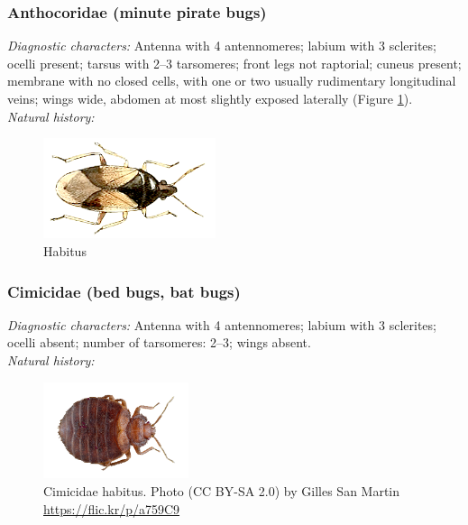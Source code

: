 \documentclass[letterpaper, 11pt]{article}
\begin{document}
\subsubsection{Anthocoridae (minute pirate bugs)}
\noindent{}\textit{Diagnostic characters:} Antenna with 4 antennomeres; labium with 3 sclerites; ocelli present; tarsus with 2--3 tarsomeres; front legs not raptorial; cuneus present; membrane with no closed cells, with one or two usually rudimentary longitudinal veins; wings wide, abdomen at most slightly exposed laterally (Figure \ref{fig:anthocorid1}).\\

\noindent{}\textit{Natural history:} \\

\begin{figure}[ht!]
 \centering
 \includegraphics[width=0.45\textwidth]{AnthocoridHabitus}
 \caption{Habitus \citep[][Plate 18, Fig. 10]{bhl45818}}
 \label{fig:anthocorid1}
\end{figure}

\subsubsection{Cimicidae (bed bugs, bat bugs)}
\noindent{}\textit{Diagnostic characters:} Antenna with 4 antennomeres; labium with 3 sclerites; ocelli absent; number of tarsomeres: 2--3; wings absent.\\

\noindent{}\textit{Natural history:} \\

\begin{figure}[ht!]
 \centering
 \includegraphics[width=0.38\textwidth]{CimicidHabitus}
 \caption{Cimicidae habitus. Photo (CC BY-SA 2.0) by Gilles San Martin \url{ https://flic.kr/p/a759C9}}
 \label{fig:cimicid1}
\end{figure}
\end{document}

